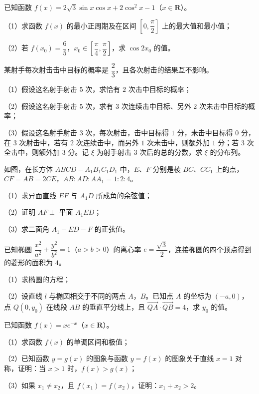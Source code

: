 \begin{question}
已知函数 $f(x)=2\sqrt3\sin x\cos x+2\cos^2x-1$（$x\in\mathbf R$）。

（1）求函数 $f(x)$ 的最小正周期及在区间 $\left[0,\dfrac\pi2\right]$ 上的最大值和最小值；

（2）若 $f(x_0)=\dfrac65$，$x_0\in\left[\dfrac\pi4,\dfrac\pi2\right]$，求 $\cos2x_0$ 的值。

\end{question}
\begin{question}
某射手每次射击击中目标的概率是 $\dfrac23$，且各次射击的结果互不影响。

（1）假设这名射手射击 $5$ 次，求恰有 $2$ 次击中目标的概率；

（2）假设这名射手射击 $5$ 次，求有 $3$ 次连续击中目标、另外 $2$ 次未击中目标的概率；

（3）假设这名射手射击 $3$ 次，每次射击，击中目标得 $1$ 分，未击中目标得 $0$ 分，在 $3$ 次射击中，若有 $2$ 次连续击中，而另外 $1$ 次未击中，则额外加 $1$ 分；若 $3$ 次全击中，则额外加 $3$ 分。记 $\xi$ 为射手射击 $3$ 次后的总的分数，求 $\xi$ 的分布列。

\Needspace{0.4\textheight}
\end{question}
\begingroup
\renewenvironment{question}{\Needspace{0.5\textheight}}{}
\begin{question}
如图，在长方体 $ABCD-A_1B_1C_1D_1$ 中，$E$、$F$ 分别是棱 $BC$、$CC_1$ 上的点，$CF=AB=2CE$，$AB:AD:AA_1=1:2:4$。

（1）求异面直线 $EF$ 与 $A_1D$ 所成角的余弦值；

（2）证明 $AF\perp$ 平面 $A_1ED$；

（3）求二面角 $A_1-ED-F$ 的正弦值。
\nopagebreak[4]
\begin{center}\end{center}
\nopagebreak[4]
\end{question}
\endgroup
\begin{question}
已知椭圆 $\dfrac{x^2}{a^2}+\dfrac{y^2}{b^2}=1$（$a>b>0$）的离心率 $e=\dfrac{\sqrt3}2$，连接椭圆的四个顶点得到的菱形的面积为 $4$。

（1）求椭圆的方程；

（2）设直线 $l$ 与椭圆相交于不同的两点 $A$，$B$。已知点 $A$ 的坐标为 $(-a,0)$，点 $Q(0,y_0)$ 在线段 $AB$ 的垂直平分线上，且 $\overrightarrow{QA}\cdot\overrightarrow{QB}=4$，求 $y_0$ 的值。

\end{question}
\begin{question}
已知函数 $f(x)=xe^{-x}$（$x\in\mathbf R$）。

（1）求函数 $f(x)$ 的单调区间和极值；

（2）已知函数 $y=g(x)$ 的图象与函数 $y=f(x)$ 的图象关于直线 $x=1$ 对称，证明：当 $x>1$ 时，$f(x)>g(x)$；

（3）如果 $x_1\neq x_2$，且 $f(x_1)=f(x_2)$，证明：$x_1+x_2>2$。

\end{question}

